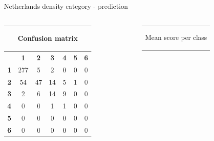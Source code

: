 \documentclass[c]{beamer}
\begin{document}
\begin{frame}
\begin{columns}
\begin{column}{0.5\textwidth}
\begin{overlayarea}{\linewidth}{4cm}
  \end{overlayarea}
  \begin{overlayarea}{\linewidth}{0.5cm}
    \centering
    \tiny Netherlands density category - prediction\par
  \end{overlayarea}
 \end{column}
\end{columns}
\begin{columns}
 \begin{column}{0.5\textwidth}
 \begin{overlayarea}{\linewidth}{2cm}
  \begin{table}
  \begin{center}
  \begin{adjustbox}{max width=0.7\textwidth}
  {\tiny
  \begin{tabular}{|c|c|c|c|c|c|c|}
    \hline
    \multicolumn{7}{|c|}{{\tiny \begin{bf}Confusion matrix\end{bf}}} \\
    \hline
     & \textbf{1} & \textbf{2} & \textbf{3} & \textbf{4} & \textbf{5} & \textbf{6}\\
    \hline
    \textbf{1} & 277 & 5 & 2 & 0 & 0 & 0\\
    \hline
    \textbf{2} & 54 & 47 & 14 & 5 & 1 & 0\\
    \hline
    \textbf{3} & 2 & 6 & 14 & 9 & 0 & 0\\
    \hline
    \textbf{4} & 0 & 0 & 1 & 1 & 0 & 0\\
    \hline
    \textbf{5} & 0 & 0 & 0 & 0 & 0 & 0\\
    \hline
    \textbf{6} & 0 & 0 & 0 & 0 & 0 & 0\\
    \hline
  \end{tabular}
  }
  \end{adjustbox}
  \end{center}
  \end{table}
 \end{overlayarea}
 \end{column}
 \begin{column}{0.5\textwidth}
 \begin{overlayarea}{\linewidth}{2cm}
  \begin{table}
    \begin{center}
    \begin{adjustbox}{max width=0.4\textwidth}
    {\tiny 
    \begin{tabular}{|c|c|}
      \hline
      \multicolumn{2}{|c|}{\begin{bf}Mean score per class\end{bf}} \\

\end{tabular}}
\end{adjustbox}
\end{center}
\end{table}
\end{overlayarea}
\end{column}
\end{columns}
\end{frame}
\end{document}
